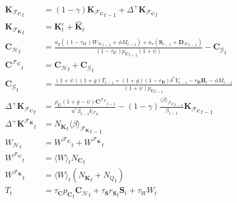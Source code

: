 \documentclass[a4paper, headings=standardclasses]{scrartcl}
\numberwithin{equation}{subsection}
\begin{document}
{\begin{align}
		{\mathbf{K}_{\mathcal{F}_\mathbf{C}}}_t           & = (1 - \gamma) {\mathbf{K}_{\mathcal{F}_\mathbf{C}}}_{t-1} + \Delta^+ {\mathbf{K}_{\mathcal{F}_\mathbf{C}}}_t \\
		{\mathbf{K}_{\mathcal{F}_\mathbf{K}}}_t           & = \mathbf{K}^e_t + \hat{\mathbf{K}}_t \\
		{\mathbf{C}_\mathcal{H}}_t                        & =  \frac{a_y ((1-\tau_W) {W_\mathcal{H}}_{t-1} + \phi M_{t-1}) + a_v (\mathbf{S}_{t-1} + {\mathbf{D}_\mathcal{H}}_{t-1})}{{(1-\tau_\mathbf{C}) p_\mathbf{C}}_{t-1} (1+\psi)} - {\mathbf{C}_\mathcal{G}}_t \\
		{\mathbf{C}^{\mathcal{F}_\mathbf{C}}}_t           & = {\mathbf{C}_\mathcal{H}}_t + {\mathbf{C}_\mathcal{G}}_t                                                                                                                                                                                                                     \\
		{\mathbf{C}_\mathcal{G}}_t                        & = \frac{(1+\psi)(1+g)T_{t-1} + (1+g)(1-r_\mathbf{B})\delta^* Y_{t-1} - r_\mathbf{B} \mathbf{B}_t - \phi M_{t-1}}{(1+\psi) {p_\mathbf{C}}_{t-1}} \\
		{\Delta^+\mathbf{K}_{\mathcal{F}_\mathbf{C}}}_t   & = \frac{\rho_\mathbf{C} (1 + g - \psi) {\mathbf{C}^{\mathcal{F}_\mathbf{C}}}_{t-1}}{u^* \beta_{t-1} k_{\mathcal{F}_\mathbf{C}}} - (1 - \gamma) \frac{{\langle\beta\rangle_{\mathcal{F}_\mathbf{C}}}_{t-1}}{\beta_{t-1}} {\mathbf{K}_{\mathcal{F}_\mathbf{C}}}_{t-1} \\
		{\Delta^+\mathbf{K}^{\mathcal{F}_\mathbf{K}}}_t   & = {N_\mathbf{K}}_t {\langle \beta \rangle_{\mathcal{F}_\mathbf{K}}}_{t-1} \\
		{W_\mathcal{H}}_t                                 & = {W^{\mathcal{F}_\mathbf{C}}}_t + {W^{\mathcal{F}_\mathbf{K}}}_t                                                                                                                                                                                                             \\
		{W^{\mathcal{F}_\mathbf{C}}}_t                    & = {\langle W \rangle}_t {N_\mathbf{C}}_t  \\
		{W^{\mathcal{F}_\mathbf{K}}}_t                    & = {\langle W \rangle}_t ({N_\mathbf{K}}_t + {N_Q}_t)    \\
		T_t                                 & = \tau_\mathbf{C} {p_\mathbf{C}}_t {\mathbf{C}_\mathcal{H}}_t + \tau_\mathbf{S} {r_\mathbf{S}}_t \mathbf{S}_t + \tau_W W_t \\

\end{align}}
\end{document}
